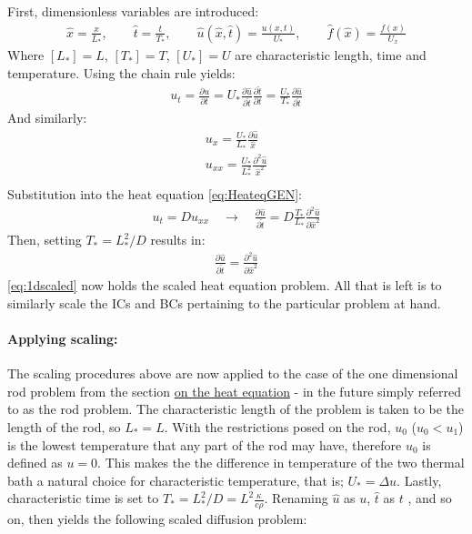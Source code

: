 \documentclass[%
oneside,                 %
final,                   %
10pt]{article}
\begin{document}
First, dimensionless variables are introduced:
\begin{align}
\hat{x}=\frac{x}{L_*}, \qquad \hat{t}=\frac{t}{T_*}, \qquad \hat{u}(\hat{x},\hat{t})=\frac{u(x,t)}{U_*},  \qquad\hat{f}(\hat{x}) =\frac{f(x)}{U_x}
\end{align}
Where $[L_*]=L$, $[T_*]=T$, $[U_*]=U$ are characteristic length, time and temperature. Using the chain rule yields:
\begin{align*}
u_t=\frac{\partial u}{\partial t}=U_* \frac{\partial \hat{u}}{\partial \hat{t}}\frac{\partial \hat{t}}{\partial t}=\frac{U_*}{T_*}\frac{\partial \hat{u}}{\partial \hat{t}} 
\end{align*}
And similarly:
\begin{align*}
u_x=\frac{U_*}{L_*}\frac{\partial \hat{u}}{\hat{x}} \\
u_{xx}=\frac{U_*}{L_*^2}\frac{\partial^2 \hat{u}}{\hat{x}^2} \\
\end{align*}
Substitution into the heat equation \eqref{eq:HeateqGEN}:
\begin{align*}
u_t=D u_{xx} \quad \rightarrow \quad \frac{\partial \hat{u}}{\partial \hat{t}}= D \frac{T_*}{L_*}\frac{\partial^2 \hat{ u}}{\partial \hat{x}^2}
\end{align*}
Then, setting $T_*=L_*^2/D$ results in: 
\begin{align}
\frac{\partial \hat{u}}{\partial \hat t}=\frac{\partial^2 \hat{u}}{\partial \hat{x}^2} \label{eq:1dscaled}
\end{align}
\eqref{eq:1dscaled} now holds the scaled heat equation problem. All that is left is to similarly scale the ICs and BCs pertaining to the particular problem at hand.

\paragraph{Applying scaling:} The scaling procedures above are now applied to the case of the one dimensional rod problem from the section \hyperref[M.1DHQ]{on the heat equation} - in the future simply referred to as the rod problem. The characteristic length of the problem is taken to be the length of the rod, so $L_*=L$. With the restrictions posed on the rod, $u_0$ ($u_0<u_1$) is the lowest temperature that any part of the rod may have, therefore $u_0$ is defined as $u=0$. This makes the the difference in temperature of the two thermal bath a natural choice for characteristic temperature, that is; $U_*=\Delta u$. Lastly, characteristic time is set to $T_*=L_*^2/D=L^2 \frac{\kappa}{c \rho}$. Renaming $\hat{u}$ as $u$, $\hat{t}$ as $t$ , and so on, then yields the following scaled diffusion problem:
\end{document}
